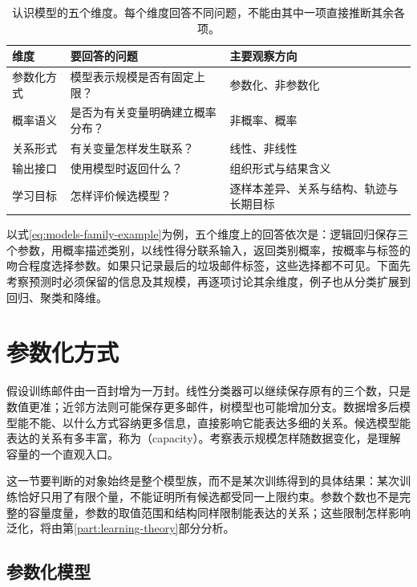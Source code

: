 \begin{table}[htbp]
  \centering
  \small
  \begin{tabularx}{\linewidth}{@{}lXX@{}}
    \toprule
    \textbf{维度} & \textbf{要回答的问题} & \textbf{主要观察方向} \\
    \midrule
    参数化方式 & 模型表示规模是否有固定上限？ & 参数化、非参数化 \\
    概率语义 & 是否为有关变量明确建立概率分布？ & 非概率、概率 \\
    关系形式 & 有关变量怎样发生联系？ & 线性、非线性 \\
    输出接口 & 使用模型时返回什么？ & 组织形式与结果含义 \\
    学习目标 & 怎样评价候选模型？ & 逐样本差异、关系与结构、轨迹与长期目标 \\
    \bottomrule
  \end{tabularx}
  \caption{认识模型的五个维度。每个维度回答不同问题，不能由其中一项直接推断其余各项。}
  \label{tab:models-dimensions}
\end{table}

以式\eqref{eq:models-family-example}为例，五个维度上的回答依次是：逻辑回归保存三个参数，用概率描述类别，以线性得分联系输入，返回类别概率，按概率与标签的吻合程度选择参数。如果只记录最后的垃圾邮件标签，这些选择都不可见。下面先考察预测时必须保留的信息及其规模，再逐项讨论其余维度，例子也从分类扩展到回归、聚类和降维。

\section{参数化方式}
\label{sec:models-capacity}

假设训练邮件由一百封增为一万封。线性分类器可以继续保存原有的三个数，只是数值更准；近邻方法则可能保存更多邮件，树模型也可能增加分支。数据增多后模型能不能、以什么方式容纳更多信息，直接影响它能表达多细的关系。候选模型能表达的关系有多丰富，称为（capacity）。考察表示规模怎样随数据变化，是理解容量的一个直观入口。

这一节要判断的对象始终是整个模型族，而不是某次训练得到的具体结果：某次训练恰好只用了有限个量，不能证明所有候选都受同一上限约束。参数个数也不是完整的容量度量，参数的取值范围和结构同样限制能表达的关系；这些限制怎样影响泛化，将由第\ref{part:learning-theory}部分分析。

\subsection{参数化模型}
\label{sec:models-parametric}

